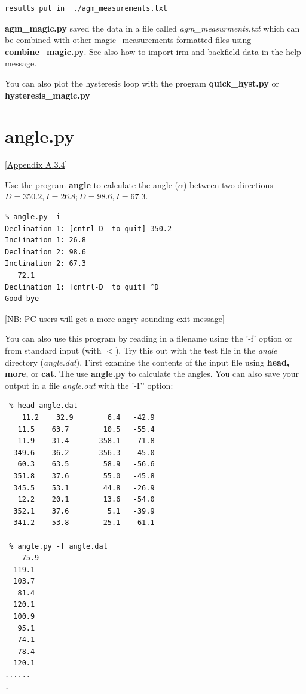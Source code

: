 \documentclass[11pt]{book}
\begin{document}
{{{{\begin{verbatim}
results put in  ./agm_measurements.txt

\end{verbatim}

{\bf agm\_magic.py} saved the data in a file called {\it agm\_measurments.txt} which can be combined with other magic\_measurements formatted files using {\bf combine\_magic.py}.    See also how to import irm and backfield data in the help message.  
 
 You can also plot the hysteresis loop with the program {\bf quick\_hyst.py} or {\bf hysteresis\_magic.py}

%
\section {\bf angle.py } [\href{http://magician.ucsd.edu/Essentials/WebBook2.html#QQ2-1-442}{Appendix A.3.4}]
\label{ex:angle}


 Use the program {\bf angle} to calculate the angle ($\alpha$) between two directions $D=350.2, I=26.8; D=98.6, I=67.3$. 

\begin{verbatim}
% angle.py -i
Declination 1: [cntrl-D  to quit] 350.2
Inclination 1: 26.8
Declination 2: 98.6
Inclination 2: 67.3
   72.1 
Declination 1: [cntrl-D  to quit] ^D
Good bye 
\end{verbatim}
 [NB: PC users will get a more angry sounding exit message]
 
 You can also use this program by reading in a filename using the '-f' option or from standard input (with $<$).  Try this out with the test file in the {\it angle} directory ({\it angle.dat}).  First examine the contents of the input file using {\bf head, more}, or {\bf cat}.  The use {\bf angle.py} to calculate the angles.  You can also save your output in a file {\it angle.out} with the '-F' option:
 
 \begin{verbatim}
 % head angle.dat
    11.2    32.9 	    6.4   -42.9 
   11.5    63.7 	   10.5   -55.4 
   11.9    31.4 	  358.1   -71.8 
  349.6    36.2 	  356.3   -45.0 
   60.3    63.5 	   58.9   -56.6 
  351.8    37.6 	   55.0   -45.8 
  345.5    53.1 	   44.8   -26.9 
   12.2    20.1 	   13.6   -54.0 
  352.1    37.6 	    5.1   -39.9 
  341.2    53.8 	   25.1   -61.1 

 % angle.py -f angle.dat
    75.9 
  119.1 
  103.7 
   81.4 
  120.1 
  100.9 
   95.1 
   74.1 
   78.4 
  120.1 
......
.
\end{verbatim}

}}}}
\end{document}
